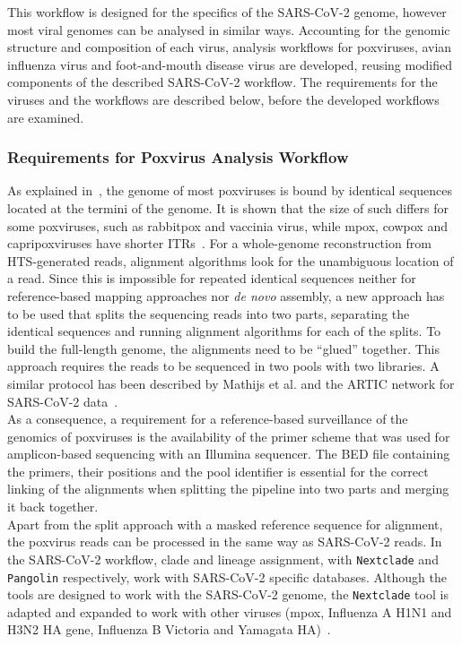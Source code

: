 This workflow is designed for the specifics of the SARS-CoV-2 genome, however most viral genomes can be analysed in similar ways. Accounting for the genomic structure and composition of each virus, analysis workflows for poxviruses, avian influenza virus and foot-and-mouth disease virus are developed, reusing modified components of the described \ac{SARS-CoV-2} workflow. The requirements for the viruses and the workflows are described below, before the developed workflows are examined. %

\subsubsection{Requirements for Poxvirus Analysis Workflow}
As explained in~, the genome of most poxviruses is bound by identical sequences located at the termini of the genome. It is shown that the size of such differs for some poxviruses, such as rabbitpox and vaccinia virus, while mpox, cowpox and capripoxviruses have shorter \acp{ITR}~\cite{wittek1978inverted}. For a whole-genome reconstruction from \ac{HTS}-generated reads, alignment algorithms look for the unambiguous location of a read. Since this is impossible for repeated identical sequences neither for reference-based mapping approaches nor \textit{de novo} assembly, a new approach has to be used that splits the sequencing reads into two parts, separating the identical sequences and running alignment algorithms for each of the splits. To build the full-length genome, the alignments need to be ``glued'' together. This approach requires the reads to be sequenced in two pools with two libraries. A similar protocol has been described by Mathijs et al. and the ARTIC network for SARS-CoV-2 data~\cite{mathijs2022robust, tyson2020improvements}. \\
As a consequence, a requirement for a reference-based surveillance of the genomics of poxviruses is the availability of the primer scheme that was used for amplicon-based sequencing with an Illumina sequencer. The \ac{BED} file containing the primers, their positions and the pool identifier is essential for the correct linking of the alignments when splitting the pipeline into two parts and merging it back together. \\
Apart from the split approach with a masked reference sequence for alignment, the poxvirus reads can be processed in the same way as \ac{SARS-CoV-2} reads. In the \ac{SARS-CoV-2} workflow, clade and lineage assignment, with \texttt{Nextclade} and \texttt{Pangolin} respectively, work with \ac{SARS-CoV-2} specific databases. Although the tools are designed to work with the \ac{SARS-CoV-2} genome, the \texttt{Nextclade} tool is adapted and expanded to work with other viruses (mpox, Influenza A H1N1 and H3N2 HA gene, Influenza B Victoria and Yamagata HA)~\cite{aksamentov2021nextclade}.

